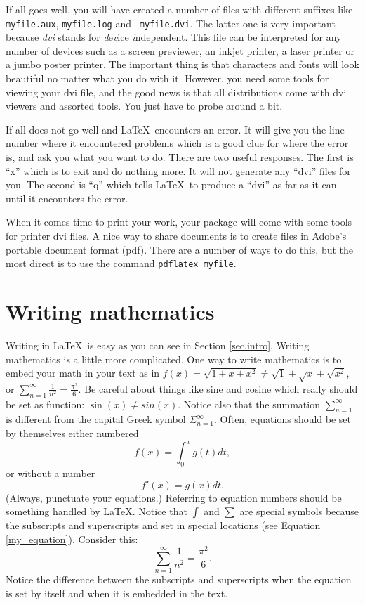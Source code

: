 \documentclass[12pt]{article}
\begin{document}
If all goes well, you will have created a number of files with
different suffixes like {\tt myfile.aux}, {\tt myfile.log} and {\tt
  myfile.dvi}.  The latter one is very important because {\em dvi}
stands for {\em d}e{\em v}ice {\em i}ndependent.  This file can be
interpreted for any number of devices such as a screen previewer, an
inkjet printer, a laser printer or a jumbo poster printer.  The
important thing is that characters and fonts will look beautiful no
matter what you do with it.  However, you need some tools for viewing
your dvi file, and the good news is that all distributions come with
dvi viewers and assorted tools.  You just have to probe around a bit.

If all does not go well and \LaTeX \ encounters an error.  It will
give you the line number where it encountered problems which is a good
clue for where the error is, and ask you what you want to do.  There
are two useful responses.  The first is ``x'' which is to exit and do
nothing more.  It will not generate any ``dvi'' files for you.  The
second is ``q'' which tells \LaTeX \ to produce a ``dvi'' as far as it
can until it encounters the error.

When it comes time to print your work, your package will come
with some tools for printer dvi files.  A nice way to share documents
is to create files in Adobe's portable document format (pdf).  There
are a number of ways to do this, but the most direct is to use the
command {\tt pdflatex myfile}.

\section{Writing mathematics}

Writing in \LaTeX \ is easy as you can see in Section \ref{sec.intro}.
Writing mathematics is a little more complicated.  One way to write
mathematics is to embed your math in your text as in $f(x) =
\sqrt{1+x+x^2} \neq \sqrt{1} + \sqrt{x} + \sqrt{x^2}$, 
or $\sum_{n=1}^\infty \frac{1}{n^2} =
\frac{\pi^2}{6}$.  Be careful about things like sine and cosine which
really should be set as function: $\sin(x) \neq sin(x)$.  Notice also
that the summation $\sum_{n=1}^\infty$ is different from the capital
Greek symbol $\Sigma_{n=1}^\infty$.  Often, equations should be set by
themselves either numbered
\begin{equation}
f(x) = \int_0^x g(t) dt,
\label{my_equation}
\end{equation}
or without a number
\[
f'(x) = g(x) dt.
\]
(Always, punctuate your equations.)
Referring to equation numbers should be something handled by \LaTeX.
Notice that $\int$ and $\sum$ are special symbols because the
subscripts and superscripts and set in special locations (see
Equation \ref{my_equation}).  Consider this:
\begin{equation}
\sum_{n=1}^\infty \frac{1}{n^2} =
\frac{\pi^2}{6}.
\end{equation}
Notice the difference between the subscripts and superscripts when the
equation is set by itself and when it is embedded in the text.
\end{document}
